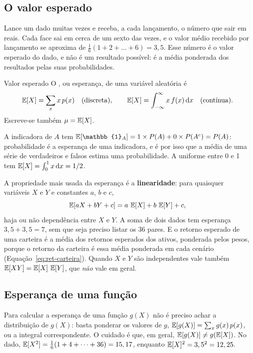 \subsection{O valor esperado}

Lance um dado muitas vezes e receba, a cada lançamento, o número que sair em reais. Cada face sai em cerca de um sexto das vezes, e o valor médio recebido por lançamento se aproxima de $\frac{1}{6}(1 + 2 + \dots + 6) = 3,5$. Esse número é o valor esperado do dado, e não é um resultado possível: é a média ponderada dos resultados pelas suas probabilidades.

\begin{definicao}{Valor esperado}
O , ou esperança, de uma variável aleatória é
\begin{equation}
  \operatorname{\mathbb{E}}[X] = \sum_x x\,p(x) \quad \text{(discreta)}, \qquad
  \operatorname{\mathbb{E}}[X] = \int_{-\infty}^{\infty} x\,f(x) \mathop{}\!\mathrm{d} x \quad \text{(contínua)} .
  \label{eq:c03-esperanca}
\end{equation}
Escreve-se também $\mu = \operatorname{\mathbb{E}}[X]$.
\end{definicao}

A indicadora de $A$ tem $\E[\mathbb{1}_A] = 1 \times P(A) + 0 \times P(A^c) = P(A)$: probabilidade é a esperança de uma indicadora, e é por isso que a média de uma série de verdadeiros e falsos estima uma probabilidade. A uniforme entre 0 e 1 tem $\operatorname{\mathbb{E}}[X] = \int_0^1 x \mathop{}\!\mathrm{d} x = 1/2$.

A propriedade mais usada da esperança é a \textbf{linearidade}: para quaisquer variáveis $X$ e $Y$ e constantes $a$, $b$ e $c$,
\begin{equation}
  \operatorname{\mathbb{E}}[aX + bY + c] = a\,\operatorname{\mathbb{E}}[X] + b\,\operatorname{\mathbb{E}}[Y] + c ,
  \label{eq:c03-linear}
\end{equation}
haja ou não dependência entre $X$ e $Y$. A soma de dois dados tem esperança $3,5 + 3,5 = 7$, sem que seja preciso listar os 36 pares. E o retorno esperado de uma carteira é a média dos retornos esperados dos ativos, ponderada pelos pesos, porque o retorno da carteira é essa média ponderada em cada cenário (Equação~\eqref{eq:ret-carteira}). Quando $X$ e $Y$ são independentes vale também $\operatorname{\mathbb{E}}[XY] = \operatorname{\mathbb{E}}[X]\,\operatorname{\mathbb{E}}[Y]$, que \emph{não} vale em geral.

\subsection{Esperança de uma função}

Para calcular a esperança de uma função $g(X)$ não é preciso achar a distribuição de $g(X)$: basta ponderar os valores de $g$, $\operatorname{\mathbb{E}}[g(X)] = \sum_x g(x)\,p(x)$, ou a integral correspondente. O cuidado é que, em geral, $\operatorname{\mathbb{E}}[g(X)] \neq g(\operatorname{\mathbb{E}}[X])$. No dado, $\operatorname{\mathbb{E}}[X^2] = \frac{1}{6}(1 + 4 + \dots + 36) = 15,17$, enquanto $\operatorname{\mathbb{E}}[X]^2 = 3,5^2 = 12,25$.

